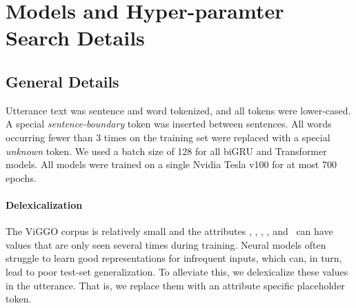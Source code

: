 \section{Models and Hyper-paramter Search Details}
\label{app:hps}

\subsection{General Details}

Utterance text was sentence and word tokenized, and all tokens were
lower-cased. A special \textit{sentence-boundary} token was inserted between
sentences. All words occurring fewer than 3 times on the training set were
replaced with a special \textit{unknown} token.  %
We used a batch size of 128 for all biGRU and
Transformer models.  All models were trained on a single Nvidia Tesla v100 for
at most 700 epochs.

\paragraph{Delexicalization} The ViGGO corpus is relatively small and the
attributes , , ,
, and ~can have values that are
only seen several times during training. Neural models often struggle to learn
good representations for infrequent inputs, which can, in turn, lead to poor
test-set generalization. To alleviate this, we delexicalize these values in
the utterance. That is, we replace them with an attribute specific placeholder
token.

